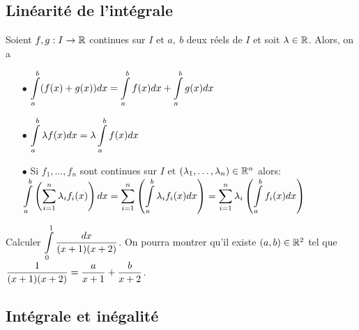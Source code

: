 \documentclass[a4paper, 11pt]{article}
\begin{document}
{\subsection{Lin\'earit\'e de l'int\'egrale}

{  \vsec

	\begin{prop}
		Soient $f, g: I\rightarrow \mathbb{R}$ continues sur $I$ et $a,\ b$ deux r\'eels de $I$ et soit $\lambda \in\mathbb{R}$. Alors, on a
		\begin{itemize}
			\item[$\bullet$] $\displaystyle \int\limits_a^b (f(x)+g(x))dx=\int\limits_a^b f(x)dx +\int\limits_a^b g(x)dx$
			\item[$\bullet$]  $\displaystyle \int\limits_a^b \lambda f(x)dx=\lambda \int\limits_a^b f(x)dx$
			\item[$\bullet$] Si $f_1,\dots, f_n$ sont continues sur $I$ et $(\lambda_1,\dots,\lambda_n) \in\mathbb{R}^n$ alors:\\
			      $\displaystyle\int\limits_a^b \left(\sum\limits_{i=1}^n \lambda_i f_i(x) \right)dx= \sum\limits_{i=1}^n \left(\int\limits_a^b\lambda_i f_i(x)dx \right)= \sum\limits_{i=1}^n \lambda_i \left(\int\limits_a^b f_i(x)dx \right)$
		\end{itemize}
	\end{prop}

}
\vsec
{\footnotesize \begin{exo}
		Calculer $\displaystyle \int\limits_0^1 \displaystyle\frac{dx}{(x+1)(x+2)}$. On pourra montrer qu'il existe $(a,b)\in\mathbb{R}^2$ tel que $\displaystyle\frac{1}{(x+1)(x+2)}=\displaystyle\frac{a}{x+1}+\displaystyle\frac{b}{x+2}$.
	\end{exo}}


\vsec \vsec
\subsection{Int\'egrale et in\'egalit\'e}


{
}}
\end{document}
